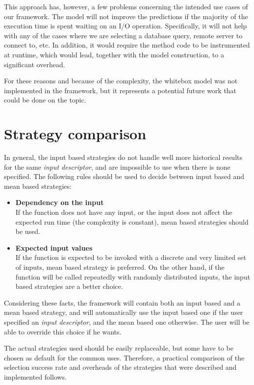 This approach has, however, a few problems concerning the intended use cases of our framework. The model will not improve the predictions if the majority of the execution time is spent waiting on an I/O operation. Specifically, it will not help with any of the cases where we are selecting a database query, remote server to connect to, etc. In addition, it would require the method code to be instrumented at runtime, which would lead, together with the model construction, to a significant overhead.

For these reasons and because of the complexity, the whitebox model was not implemented in the framework, but it represents a potential future work that could be done on the topic.

\section{Strategy comparison}
\label{sec:strategy_comparison}

In general, the input based strategies do not handle well more historical results for the same \textit{input descriptor}, and are impossible to use when there is none specified. The following rules should be used to decide between input based and mean based strategies:

\begin{itemize}
	\item \textbf{Dependency on the input} \\
	If the function does not have any input, or the input does not affect the expected run time (the complexity is constant), mean based strategies should be used.
	\item \textbf{Expected input values} \\
	If the function is expected to be invoked with a discrete and very limited set of inputs, mean based strategy is preferred. On the other hand, if the function will be called repeatedly with randomly distributed inputs, the input based strategies are a better choice.
\end{itemize}

Considering these facts, the framework will contain both an input based and a mean based strategy, and will automatically use the input based one if the user specified an \textit{input descriptor}, and the mean based one otherwise. The user will be able to override this choice if he wants.

The actual strategies used should be easily replaceable, but some have to be chosen as default for the common uses. Therefore, a practical comparison of the selection success rate and overheads of the strategies that were described and implemented follows.

